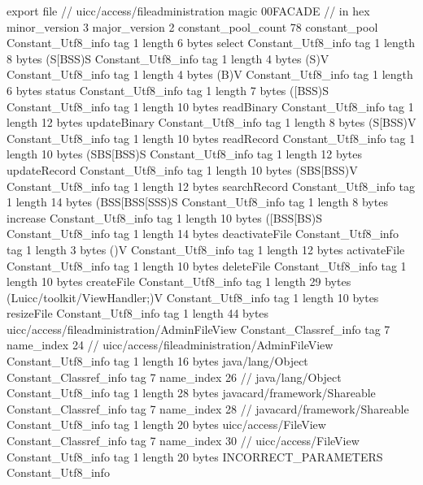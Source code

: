 export file {		// uicc/access/fileadministration
	magic	00FACADE		 // in hex
	minor_version	3
	major_version	2
	constant_pool_count	78
	constant_pool {
		Constant_Utf8_info {
			tag	1
			length	6
			bytes	select
		}
		Constant_Utf8_info {
			tag	1
			length	8
			bytes	(S[BSS)S
		}
		Constant_Utf8_info {
			tag	1
			length	4
			bytes	(S)V
		}
		Constant_Utf8_info {
			tag	1
			length	4
			bytes	(B)V
		}
		Constant_Utf8_info {
			tag	1
			length	6
			bytes	status
		}
		Constant_Utf8_info {
			tag	1
			length	7
			bytes	([BSS)S
		}
		Constant_Utf8_info {
			tag	1
			length	10
			bytes	readBinary
		}
		Constant_Utf8_info {
			tag	1
			length	12
			bytes	updateBinary
		}
		Constant_Utf8_info {
			tag	1
			length	8
			bytes	(S[BSS)V
		}
		Constant_Utf8_info {
			tag	1
			length	10
			bytes	readRecord
		}
		Constant_Utf8_info {
			tag	1
			length	10
			bytes	(SBS[BSS)S
		}
		Constant_Utf8_info {
			tag	1
			length	12
			bytes	updateRecord
		}
		Constant_Utf8_info {
			tag	1
			length	10
			bytes	(SBS[BSS)V
		}
		Constant_Utf8_info {
			tag	1
			length	12
			bytes	searchRecord
		}
		Constant_Utf8_info {
			tag	1
			length	14
			bytes	(BSS[BSS[SSS)S
		}
		Constant_Utf8_info {
			tag	1
			length	8
			bytes	increase
		}
		Constant_Utf8_info {
			tag	1
			length	10
			bytes	([BSS[BS)S
		}
		Constant_Utf8_info {
			tag	1
			length	14
			bytes	deactivateFile
		}
		Constant_Utf8_info {
			tag	1
			length	3
			bytes	()V
		}
		Constant_Utf8_info {
			tag	1
			length	12
			bytes	activateFile
		}
		Constant_Utf8_info {
			tag	1
			length	10
			bytes	deleteFile
		}
		Constant_Utf8_info {
			tag	1
			length	10
			bytes	createFile
		}
		Constant_Utf8_info {
			tag	1
			length	29
			bytes	(Luicc/toolkit/ViewHandler;)V
		}
		Constant_Utf8_info {
			tag	1
			length	10
			bytes	resizeFile
		}
		Constant_Utf8_info {
			tag	1
			length	44
			bytes	uicc/access/fileadministration/AdminFileView
		}
		Constant_Classref_info {
			tag	7
			name_index	24		// uicc/access/fileadministration/AdminFileView
		}
		Constant_Utf8_info {
			tag	1
			length	16
			bytes	java/lang/Object
		}
		Constant_Classref_info {
			tag	7
			name_index	26		// java/lang/Object
		}
		Constant_Utf8_info {
			tag	1
			length	28
			bytes	javacard/framework/Shareable
		}
		Constant_Classref_info {
			tag	7
			name_index	28		// javacard/framework/Shareable
		}
		Constant_Utf8_info {
			tag	1
			length	20
			bytes	uicc/access/FileView
		}
		Constant_Classref_info {
			tag	7
			name_index	30		// uicc/access/FileView
		}
		Constant_Utf8_info {
			tag	1
			length	20
			bytes	INCORRECT_PARAMETERS
		}
		Constant_Utf8_info {
}}}
